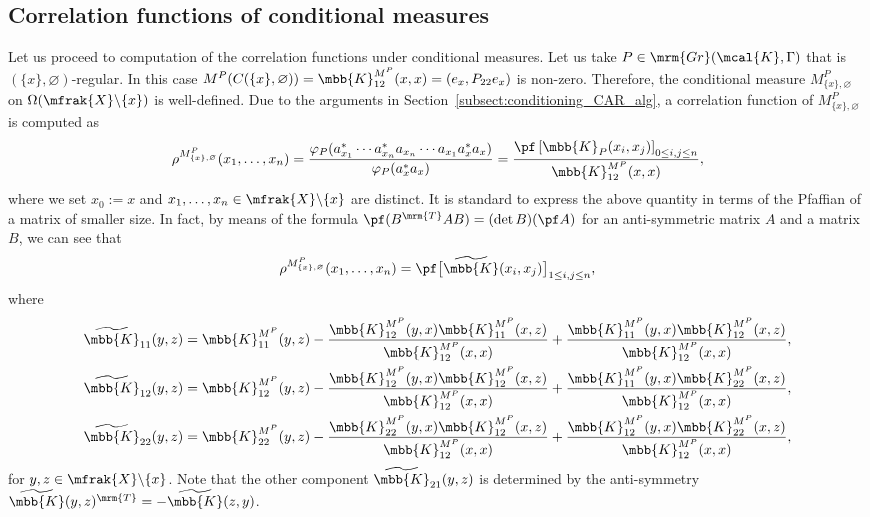 \subsection{Correlation functions of conditional measures}
Let us proceed to computation of the correlation functions under conditional measures.
Let us take $P\in \mrm{Gr}(\mcal{K},\Gamma)$ that is $(\{x\},\varnothing)$-regular. In this case $M^{P}(C(\{x\},\varnothing))=\mbb{K}^{M^{P}}_{12}(x,x)=(e_{x},P_{22}e_{x})$ is non-zero. Therefore, the conditional measure $M^{P}_{\{x\},\varnothing}$ on $\Omega (\mfrak{X}\backslash\{x\})$ is well-defined. Due to the arguments in Section~\ref{subsect:conditioning_CAR_alg}, a correlation function of $M^{P}_{\{x\},\varnothing}$ is computed as
\begin{gather*}
	\rho^{M^{P}_{\{x\},\varnothing}}(x_{1},\dots, x_{n}) =\frac{\varphi_{P}(a_{x_{1}}^{\ast}\cdots a_{x_{n}}^{\ast}a_{x_{n}}\cdots a_{x_{1}}a_{x}^{\ast}a_{x})}{\varphi_{P}(a_{x}^{\ast}a_{x})}
	 =\frac{\pf \left[\mbb{K}_{P}(x_{i},x_{j})\right]_{0\le i,j\le n}}{\mbb{K}^{M^{P}}_{12}(x,x)},
\end{gather*}
where we set $x_{0}:=x$ and $x_{1},\dots, x_{n}\in \mfrak{X}\backslash \{x\}$ are distinct.
It is standard to express the above quantity in terms of the Pfaffian of a matrix of smaller size.
In fact, by means of the formula $\pf (B^{\mrm{T}}AB)=(\det B)(\pf A)$ for an anti-symmetric matrix $A$ and a matrix $B$, we can see that
\begin{equation*}
	\rho^{M^{P}_{\{x\},\varnothing}}(x_{1},\dots, x_{n})=\pf \big[\widetilde{\mbb{K}}(x_{i},x_{j})\big]_{1\le i,j\le n},
\end{equation*}
where
\begin{gather*}
\widetilde{\mbb{K}}_{11}(y,z)=\mbb{K}^{M^{P}}_{11}(y,z)-\frac{\mbb{K}^{M^{P}}_{12}(y,x)\mbb{K}^{M^{P}}_{11}(x,z)}{\mbb{K}^{M^{P}}_{12}(x,x)}+\frac{\mbb{K}^{M^{P}}_{11}(y,x)\mbb{K}^{M^{P}}_{12}(x,z)}{\mbb{K}^{M^{P}}_{12}(x,x)}, \\
\widetilde{\mbb{K}}_{12}(y,z)=\mbb{K}^{M^{P}}_{12}(y,z)-\frac{\mbb{K}^{M^{P}}_{12}(y,x)\mbb{K}^{M^{P}}_{12}(x,z)}{\mbb{K}^{M^{P}}_{12}(x,x)}+\frac{\mbb{K}^{M^{P}}_{11}(y,x)\mbb{K}^{M^{P}}_{22}(x,z)}{\mbb{K}^{M^{P}}_{12}(x,x)}, \\
\widetilde{\mbb{K}}_{22}(y,z)=\mbb{K}^{M^{P}}_{22}(y,z)-\frac{\mbb{K}^{M^{P}}_{22}(y,x)\mbb{K}^{M^{P}}_{12}(x,z)}{\mbb{K}^{M^{P}}_{12}(x,x)}+\frac{\mbb{K}^{M^{P}}_{12}(y,x)\mbb{K}^{M^{P}}_{22}(x,z)}{\mbb{K}^{M^{P}}_{12}(x,x)},
\end{gather*}
for $y,z\in\mfrak{X}\backslash\{x\}$. Note that the other component $\widetilde{\mbb{K}}_{21}(y,z)$ is determined by the anti-symmetry $\widetilde{\mbb{K}}(y,z)^{\mrm{T}}=-\widetilde{\mbb{K}}(z,y)$.

